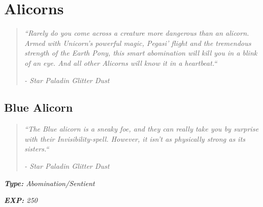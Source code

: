 \documentclass[11pt,a4paper,twocolumn]{book}
\begin{document}
%		
%	
%	
%	
%	
	
	\section*{Alicorns}
	\begin{quote}
		\emph{``Rarely do you come across a creature more dangerous than an alicorn. Armed with Unicorn's powerful magic, Pegasi' flight and the tremendous strength of the Earth Pony, this smart abomination will kill you in a blink of an eye. And all other Alicorns will know it in a heartbeat.``}
		
		\emph{-	Star Paladin Glitter Dust}
	\end{quote}
	
	\subsection*{Blue Alicorn}
	\begin{quote}
		\emph{``The Blue alicorn is a sneaky foe, and they can really take you by surprise with their Invisibility-spell. However, it isn't as physically strong as its sisters.``}
		
		\emph{-	Star Paladin Glitter Dust}
	\end{quote}
	\emph{\textbf{Type:} Abomination/Sentient}
	
	\noindent
	\emph{\textbf{EXP:} 250}
		
\end{document}
